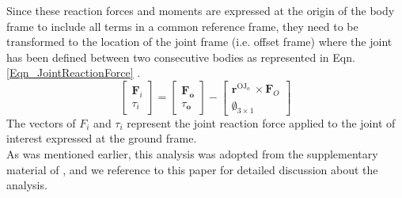 \documentclass[10pt,letterpaper]{article}
\begin{document}
Since these reaction forces and moments are expressed at the origin of the body frame to include all terms in a common reference frame, they need to be transformed to the location of the joint frame (i.e. offset frame) where the joint has been defined between two consecutive bodies as represented in Eqn. \eqref{Eqn_JointReactionForce} \cite{151}.
\begin{equation}\label{Eqn_JointReactionForce}
\left\lbrack \begin{array}{c}
{\mathit{\mathbf{F}}}_i \\
\tau_i 
\end{array}\right\rbrack =\left\lbrack \begin{array}{c}
{\mathit{\mathbf{F}}}_{\mathit{\mathbf{o}}} \\
\tau_{\mathit{\mathbf{o}}} 
\end{array}\right\rbrack -\left\lbrack \begin{array}{c}
{\mathit{\mathbf{r}}}^{{\mathrm{OJ}}_o \;} \times {\mathit{\mathbf{F}}}_O \\
\emptyset_{3\times 1} 
\end{array}\right\rbrack
\end{equation}
The vectors of $F_i$ and $\tau_i$ represent the joint reaction force applied to the joint of interest expressed at the ground frame.\\
As was mentioned earlier, this analysis was adopted from the supplementary material of \cite{151}, and we reference to this paper for detailed discussion about the analysis.\\
\end{document}
